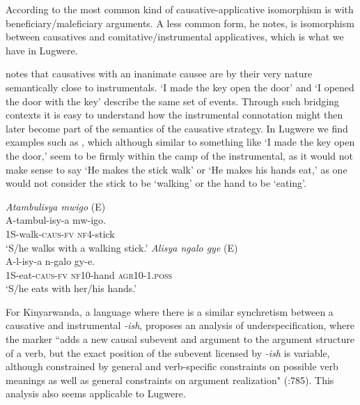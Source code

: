 \documentclass[output=paper,colorlinks,citecolor=brown,draftmode]{langscibook}
\begin{document}
According to \citet{peterson2006applicative} the most common kind of causative-applicative isomorphism is with beneficiary/maleficiary arguments.  A less common form, he notes, is isomorphism between causatives and comitative/instrumental applicatives, which is what we have in Lugwere. 

\citet{peterson2006applicative} notes that causatives with an inanimate causee are by their very nature semantically close to instrumentals. `I made the key open the door' and `I opened the door with the key'  describe the same set of events. Through such bridging contexts it is easy to understand how the instrumental connotation might then later become part of the semantics of the causative strategy. In Lugwere we find  examples such as , which although similar to something like `I made the key open the door,' seem to be firmly within the camp of the instrumental, as it would not make sense to say `He makes the stick walk' or `He makes his hands eat,' as one would not consider the stick to be `walking' or the hand to be `eating'. 

\ea
\begin{xlist}   \label{ex:Saebo:notcaus}
 \ex \emph{Atambulisya mwigo} (E)\\
  \gll A-tambul-isy-a mw-igo.  \\ 
1S-walk-\textsc{caus-fv} \textsc{nf4}-stick \\
    \glt  `S/he walks with a walking stick.' 
     \ex \emph{Alisya ngalo gye} (E)\\
  \gll A-l-isy-a n-galo gy-e.  \\ 
1S-eat-\textsc{caus-fv} \textsc{nf10}-hand \textsc{agr10-1.poss} \\
    \glt  `S/he eats with her/his hands.' 
      \end{xlist}     
      \z

For Kinyarwanda, a language where there is a similar synchretism between a causative and instrumental \emph{-ish}, \citet{jerro2017causative} proposes an analysis of underspecification, where the marker ``adds a new causal subevent and argument to the argument structure of a verb, but the exact position of the subevent licensed by \emph{-ish} is variable, although constrained by general and verb-specific constraints on possible verb meanings as well as general constraints on argument realization" (\citeauthor{jerro2017causative}\citeyear{jerro2017causative}:785). This analysis also seems applicable to Lugwere.
\end{document}
